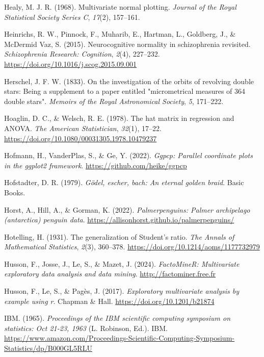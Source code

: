 \documentclass[
  letterpaper,
  10pt,
  krantz2]{krantz}
\newlength{\cslhangindent}
\newenvironment{CSLReferences}[2] %
 {\begin{list}{}{%
  \setlength{\itemindent}{0pt}
  \setlength{\leftmargin}{0pt}
  \setlength{\parsep}{0pt}
  \ifodd #1
   \setlength{\leftmargin}{\cslhangindent}
   \setlength{\itemindent}{-1\cslhangindent}
  \fi
  \setlength{\itemsep}{#2\baselineskip}}}
 {\end{list}}
\begin{document}
\begin{CSLReferences}{1}{0}
Healy, M. J. R. (1968). Multivariate normal plotting. \emph{Journal of
the Royal Statistical Society Series C}, \emph{17}(2), 157--161.

Heinrichs, R. W., Pinnock, F., Muharib, E., Hartman, L., Goldberg, J.,
\& McDermid Vaz, S. (2015). Neurocognitive normality in schizophrenia
revisited. \emph{Schizophrenia Research: Cognition}, \emph{2}(4),
227--232. \url{https://doi.org/10.1016/j.scog.2015.09.001}

Herschel, J. F. W. (1833). On the investigation of the orbits of
revolving double stars: Being a supplement to a paper entitled
"micrometrical measures of 364 double stars". \emph{Memoirs of the Royal
Astronomical Society}, \emph{5}, 171--222.

Hoaglin, D. C., \& Welsch, R. E. (1978). The hat matrix in regression
and {ANOVA}. \emph{The American Statistician}, \emph{32}(1), 17--22.
\url{https://doi.org/10.1080/00031305.1978.10479237}

Hofmann, H., VanderPlas, S., \& Ge, Y. (2022). \emph{Ggpcp: Parallel
coordinate plots in the ggplot2 framework}.
\url{https://github.com/heike/ggpcp}

Hofstadter, D. R. (1979). \emph{Gödel, escher, bach: An eternal golden
braid}. Basic Books.

Horst, A., Hill, A., \& Gorman, K. (2022). \emph{Palmerpenguins: Palmer
archipelago (antarctica) penguin data}.
\url{https://allisonhorst.github.io/palmerpenguins/}

Hotelling, H. (1931). The generalization of {Student's} ratio. \emph{The
Annals of Mathematical Statistics}, \emph{2}(3), 360--378.
\url{https://doi.org/10.1214/aoms/1177732979}

Husson, F., Josse, J., Le, S., \& Mazet, J. (2024). \emph{FactoMineR:
Multivariate exploratory data analysis and data mining}.
\url{http://factominer.free.fr}

Husson, F., Le, S., \& Pagès, J. (2017). \emph{Exploratory multivariate
analysis by example using r}. Chapman \& Hall.
\url{https://doi.org/10.1201/b21874}

IBM. (1965). \emph{Proceedings of the IBM scientific computing symposium
on statistics: Oct 21-23, 1963} (L. Robinson, Ed.). IBM.
\url{https://www.amazon.com/Proceedings-Scientific-Computing-Symposium-Statistics/dp/B000GL5RLU}


\end{CSLReferences}
\end{document}
